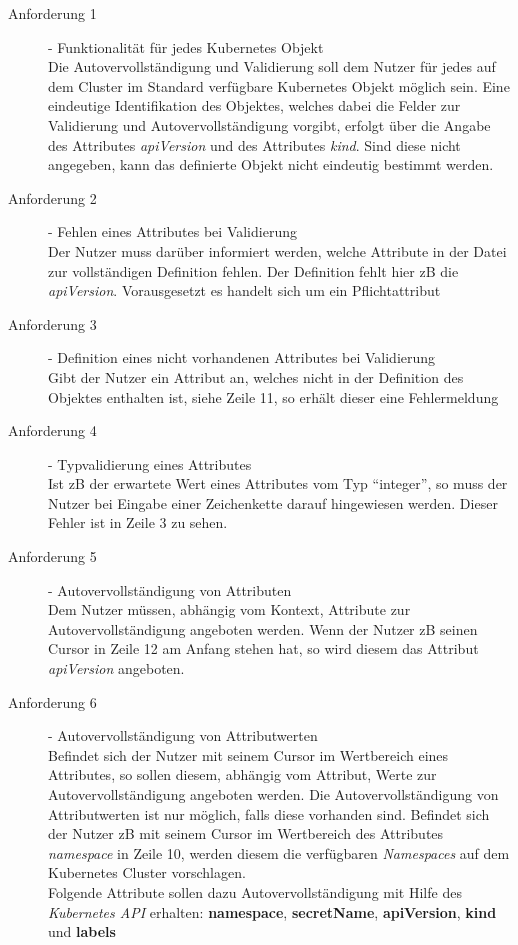 \begin{description}
      \item[Anforderung 1]{- Funktionalität für jedes Kubernetes Objekt\\}
            Die Autovervollständigung und Validierung soll dem Nutzer für jedes auf dem Cluster im Standard verfügbare Kubernetes Objekt möglich sein.
            Eine eindeutige Identifikation des Objektes, welches dabei die Felder zur Validierung und Autovervollständigung vorgibt, erfolgt über
            die Angabe des Attributes \textit{apiVersion} und des Attributes \textit{kind}. Sind diese nicht angegeben, kann das definierte Objekt nicht
            eindeutig bestimmt werden.
      \item[Anforderung 2]{- Fehlen eines Attributes bei Validierung\\}
            Der Nutzer muss darüber informiert werden, welche Attribute
            in der Datei zur vollständigen Definition fehlen. Der Definition fehlt hier \ac{zB}
            die \textit{apiVersion}. Vorausgesetzt es handelt sich um ein Pflichtattribut
      \item[Anforderung 3]{- Definition eines nicht vorhandenen Attributes bei Validierung\\}
            Gibt der Nutzer ein Attribut an, welches nicht in der Definition des Objektes enthalten ist, siehe Zeile 11, so erhält dieser eine Fehlermeldung
      \item[Anforderung 4]{- Typvalidierung eines Attributes\\}
            Ist \ac{zB} der erwartete Wert eines Attributes vom Typ ``integer'',
            so muss der Nutzer bei Eingabe einer Zeichenkette darauf hingewiesen werden. Dieser Fehler ist in Zeile 3 zu sehen.
      \item[Anforderung 5]{- Autovervollständigung von Attributen\\}
            Dem Nutzer müssen, abhängig vom Kontext, Attribute zur Autovervollständigung angeboten werden.
            Wenn der Nutzer \ac{zB} seinen Cursor in Zeile 12 am Anfang stehen hat, so wird diesem das Attribut \textit{apiVersion} angeboten.
      \item[Anforderung 6]{- Autovervollständigung von Attributwerten\\}
            Befindet sich der Nutzer mit seinem Cursor im Wertbereich eines Attributes, so sollen diesem, abhängig vom Attribut, Werte zur Autovervollständigung
            angeboten werden. Die Autovervollständigung von Attributwerten ist nur möglich, falls diese vorhanden sind.
            Befindet sich der Nutzer \ac{zB} mit seinem Cursor im Wertbereich des Attributes \textit{namespace} in Zeile 10,
            werden diesem die verfügbaren \textit{Namespaces} auf dem Kubernetes Cluster vorschlagen.
            \\
            Folgende Attribute sollen dazu Autovervollständigung mit Hilfe des \textit{Kubernetes API} erhalten:
            \textbf{namespace}, \textbf{secretName}, \textbf{apiVersion}, \textbf{kind} und \textbf{labels}
\end{description}

